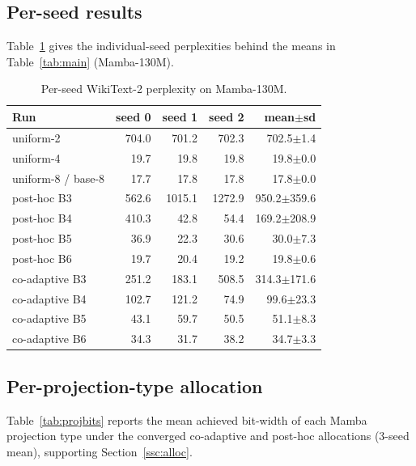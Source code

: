 \documentclass[conference]{IEEEtran}
\begin{document}
\subsection{Per-seed results}
Table~\ref{tab:perseed} gives the individual-seed perplexities behind the means in
Table~\ref{tab:main} (Mamba-130M).

\begin{table}[h]
\caption{Per-seed WikiText-2 perplexity on Mamba-130M.}
\label{tab:perseed}
\begin{center}
\begin{tabular}{lrrrr}
\toprule
\textbf{Run} & \textbf{seed 0} & \textbf{seed 1} & \textbf{seed 2} & \textbf{mean$\pm$sd} \\
\midrule
uniform-2          & 704.0 & 701.2 & 702.3 & 702.5$\pm$1.4 \\
uniform-4          & 19.7  & 19.8  & 19.8  & 19.8$\pm$0.0 \\
uniform-8 / base-8 & 17.7  & 17.8  & 17.8  & 17.8$\pm$0.0 \\
\midrule
post-hoc B3 & 562.6 & 1015.1 & 1272.9 & 950.2$\pm$359.6 \\
post-hoc B4 & 410.3 & 42.8   & 54.4   & 169.2$\pm$208.9 \\
post-hoc B5 & 36.9  & 22.3   & 30.6   & 30.0$\pm$7.3 \\
post-hoc B6 & 19.7  & 20.4   & 19.2   & 19.8$\pm$0.6 \\
\midrule
co-adaptive B3 & 251.2 & 183.1 & 508.5 & 314.3$\pm$171.6 \\
co-adaptive B4 & 102.7 & 121.2 & 74.9  & 99.6$\pm$23.3 \\
co-adaptive B5 & 43.1  & 59.7  & 50.5  & 51.1$\pm$8.3 \\
co-adaptive B6 & 34.3  & 31.7  & 38.2  & 34.7$\pm$3.3 \\
\bottomrule
\end{tabular}
\end{center}
\end{table}

\subsection{Per-projection-type allocation}
Table~\ref{tab:projbits} reports the mean achieved bit-width of each Mamba
projection type under the converged co-adaptive and post-hoc allocations (3-seed mean),
supporting Section~\ref{ssc:alloc}.
\end{document}
